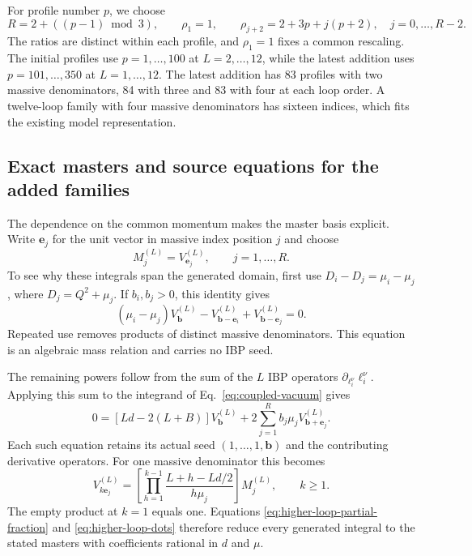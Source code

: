 For profile number $p$, we choose
\begin{equation}
 R=2+((p-1)\bmod3),\qquad
 \rho_1=1,\qquad
 \rho_{j+2}=2+3p+j(p+2),\quad j=0,\ldots,R-2 .
 \label{eq:higher-loop-masses}
\end{equation}
The ratios are distinct within each profile, and $\rho_1=1$ fixes a
common rescaling. The initial profiles use $p=1,\ldots,100$ at
$L=2,\ldots,12$, while the latest addition uses
$p=101,\ldots,350$ at $L=1,\ldots,12$. The latest addition
has 83 profiles with two massive denominators, 84 with three and
83 with four at each loop order.
A twelve-loop family with four massive denominators has sixteen
indices, which fits the existing model representation.

\subsection{Exact masters and source equations for the added families}
The dependence on the common momentum makes the master basis
explicit. Write $\boldsymbol e_j$ for the unit vector in massive
index position $j$ and choose
\begin{equation}
 M_j^{(L)}=V^{(L)}_{\boldsymbol e_j},
 \qquad j=1,\ldots,R .
 \label{eq:higher-loop-masters}
\end{equation}
To see why these integrals span the generated domain, first use
$D_i-D_j=\mu_i-\mu_j$, where $D_j=Q^2+\mu_j$. If $b_i,b_j>0$,
this identity gives
\begin{equation}
 (\mu_i-\mu_j)V^{(L)}_{\boldsymbol b}
 -V^{(L)}_{\boldsymbol b-\boldsymbol e_i}
 +V^{(L)}_{\boldsymbol b-\boldsymbol e_j}=0 .
 \label{eq:higher-loop-partial-fraction}
\end{equation}
Repeated use removes products of distinct massive denominators.
This equation is an algebraic mass relation and carries no IBP seed.

The remaining powers follow from the sum of the $L$ IBP operators
$\partial_{\ell_i^\nu}\ell_i^\nu$. Applying this sum to the integrand
of Eq.~\eqref{eq:coupled-vacuum} gives
\begin{equation}
 0=[Ld-2(L+B)]V^{(L)}_{\boldsymbol b}
   +2\sum_{j=1}^{R}b_j\mu_j
                 V^{(L)}_{\boldsymbol b+\boldsymbol e_j}.
 \label{eq:higher-loop-euler}
\end{equation}
Each such equation retains its actual seed
$(1,\ldots,1,\boldsymbol b)$ and the contributing derivative operators.
For one massive denominator this becomes
\begin{equation}
 V^{(L)}_{k\boldsymbol e_j}
 =\left[\prod_{h=1}^{k-1}
       \frac{L+h-Ld/2}{h\mu_j}\right]M_j^{(L)},
 \qquad k\geq1 .
 \label{eq:higher-loop-dots}
\end{equation}
The empty product at $k=1$ equals one. Equations
\eqref{eq:higher-loop-partial-fraction} and
\eqref{eq:higher-loop-dots} therefore reduce every generated integral
to the stated masters with coefficients rational in $d$ and $\mu$.

